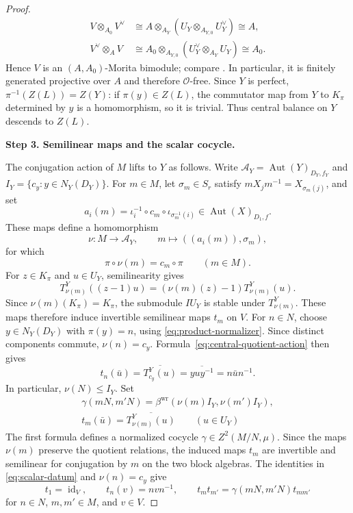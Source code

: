 \documentclass[11pt,a4paper]{article}
\theoremstyle{definition}
\theoremstyle{remark}
\numberwithin{equation}{section}
\newcommand{\cO}{\mathcal{O}}
\DeclareMathOperator{\Aut}{Aut}
\DeclareMathOperator{\id}{id}
\newcommand{\proofstep}[1]{%
	\par\addvspace{\medskipamount}%
	\noindent\textbf{#1}\par\nobreak
	\smallskip\nobreak\noindent\ignorespaces
}
\begin{document}
\begin{proof}
\[\begin{aligned}
			V\otimes_{A_0} V^\vee
			&\cong A\otimes_{A_Y}
			(U_Y\otimes_{A_{Y,0}}U_Y^\vee)\cong A,\\
			V^\vee\otimes_A V
			&\cong A_0\otimes_{A_{Y,0}}
			(U_Y^\vee\otimes_{A_Y}U_Y)\cong A_0.
		\end{aligned}
		\]
		Hence $V$ is an $(A,A_0)$-Morita bimodule; compare
		\cite[Remark~2.7]{KessarKoshitaniLinckelmann2015}. In particular, it is finitely generated
		projective over $A$ and therefore $\cO$-free.
		Since $Y$ is perfect, $\pi^{-1}(Z(L))=Z(Y)$: if
		$\pi(y)\in Z(L)$, the commutator map from $Y$ to $K_\pi$ determined
		by $y$ is a homomorphism, so it is trivial. Thus central balance
		on $Y$ descends to $Z(L)$.
		
		\proofstep{Step 3. Semilinear maps and the scalar cocycle.}
		The conjugation action of $M$ lifts to $Y$ as follows.
		Write $\mathcal A_Y=\Aut(Y)_{D_Y,f_Y}$ and
		$I_Y=\{c_y:y\in N_Y(D_Y)\}$. For $m\in M$, let
		$\sigma_m\in S_r$ satisfy $mX_jm^{-1}=X_{\sigma_m(j)}$, and set
		\[
		a_i(m)=\iota_i^{-1}\circ c_m\circ\iota_{\sigma_m^{-1}(i)}
		\in\Aut(X)_{D_1,f}.
		\]
		These maps define a homomorphism
		\[
		\nu:M\longrightarrow\mathcal A_Y,\qquad
		m\longmapsto((a_i(m)),\sigma_m),
		\]
		for which
		\begin{equation}\label{eq:lifted-conjugation}
			\pi\circ\nu(m)=c_m\circ\pi\qquad(m\in M).
		\end{equation}
		For $z\in K_\pi$ and $u\in U_Y$, semilinearity gives
		\[
		T^Y_{\nu(m)}((z-1)u)
		=(\nu(m)(z)-1)T^Y_{\nu(m)}(u).
		\]
		Since $\nu(m)(K_\pi)=K_\pi$, the submodule $IU_Y$ is stable
		under $T^Y_{\nu(m)}$. These maps therefore induce invertible
		semilinear maps $t_m$ on $V$.
		For $n\in N$, choose $y\in N_Y(D_Y)$ with $\pi(y)=n$, using
		\eqref{eq:product-normalizer}. Since distinct components commute,
		$\nu(n)=c_y$. Formula~\eqref{eq:central-quotient-action} then gives
		\[
		t_n(\bar u)=\overline{T^Y_{c_y}(u)}
		=\overline{yuy^{-1}}=n\bar u n^{-1}.
		\]
		In particular, $\nu(N)\leq I_Y$. Set
		\begin{equation}\label{eq:quotient-relative-data}
			\begin{gathered}
				\gamma(mN,m'N)=\beta^{\mathrm{wr}}(\nu(m)I_Y,\nu(m')I_Y),\\
				t_m(\bar u)=\overline{T^Y_{\nu(m)}(u)}\qquad(u\in U_Y)
			\end{gathered}
		\end{equation}
		The first formula defines a normalized cocycle
		$\gamma\in Z^2(M/N,\mu)$. Since the maps $\nu(m)$ preserve
		the quotient relations, the induced maps $t_m$ are invertible
		and semilinear for conjugation by $m$ on the two block algebras.
		The identities in \eqref{eq:scalar-datum} and $\nu(n)=c_y$ give
		\begin{equation}\label{eq:relative-datum}
			t_1=\id_V,\qquad
			t_n(v)=nvn^{-1},\qquad
			t_mt_{m'}=\gamma(mN,m'N)t_{mm'}
		\end{equation}
		for $n\in N$, $m,m'\in M$, and $v\in V$.
		

\end{proof}
\end{document}
